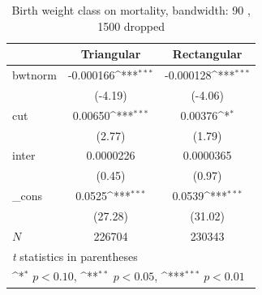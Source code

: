 \documentclass[a4paper,11pt]{article}
\begin{document}
\begin{table}[htbp]\centering
\def\sym#1{\ifmmode^{#1}\else\(^{#1}\)\fi}
\caption{Birth weight class on mortality, bandwidth: 90 , 1500 dropped}
\label{B2.bw90}
\begin{tabular}{l*{2}{c}}
\hline\hline
            &\multicolumn{1}{c}{Triangular}&\multicolumn{1}{c}{Rectangular}\\
\hline
bwtnorm     &   -0.000166\sym{***}&   -0.000128\sym{***}\\
            &     (-4.19)         &     (-4.06)         \\
[1em]
cut         &     0.00650\sym{***}&     0.00376\sym{*}  \\
            &      (2.77)         &      (1.79)         \\
[1em]
inter       &   0.0000226         &   0.0000365         \\
            &      (0.45)         &      (0.97)         \\
[1em]
\_cons      &      0.0525\sym{***}&      0.0539\sym{***}\\
            &     (27.28)         &     (31.02)         \\
\hline
\(N\)       &      226704         &      230343         \\
\hline\hline
\multicolumn{3}{l}{\footnotesize \textit{t} statistics in parentheses}\\
\multicolumn{3}{l}{\footnotesize \sym{*} \(p<0.10\), \sym{**} \(p<0.05\), \sym{***} \(p<0.01\)}\\
\end{tabular}
\end{table}


\end{document}
